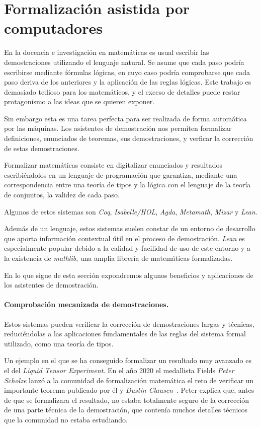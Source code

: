 \section{Formalización asistida por computadores}

En la docencia e investigación en matemáticas es usual escribir las
demostraciones utilizando el lenguaje natural. Se asume que cada paso podría
escribirse mediante fórmulas lógicas, en cuyo caso podría comprobarse que cada
paso deriva de los anteriores y la aplicación de las reglas lógicas. Este
trabajo es demasiado tedioso para los matemáticos, y el exceso
de detalles puede restar protagonismo a las ideas que se quieren exponer.

Sin embargo esta es una tarea perfecta para ser realizada de forma automática
por las máquinas. Los asistentes de demostración nos permiten formalizar
definiciones, enunciados de teoremas, sus demostraciones, y verficar la
corrección de estas demostraciones.

Formalizar matemáticas consiste en digitalizar enunciados y resultados
escribiéndolos en un lenguaje de programación que garantiza, mediante una
correspondencia entre una teoría de tipos y la lógica con el lenguaje de la
teoría de conjuntos, la validez de cada paso.

Algunos de estos sistemas son \textit{Coq},  \textit{Isabelle/HOL},  \textit{Agda},
\textit{Metamath}, \textit{Mizar} y \textit{Lean}.

Además de un lenguaje, estos sistemas suelen constar de un entorno de desarrollo
que aporta información contextual útil en el proceso de demostración.
\textit{Lean} es especialmente popular debido a la calidad y facilidad de uso de
este entorno y a la existencia de \textit{mathlib}, una amplia librería de
matemáticas formalizadas.

En lo que sigue de esta sección expondremos algunos beneficios y aplicaciones
de los asistentes de demostración.

\paragraph{Comprobación mecanizada de demostraciones.}

Estos sistemas pueden verificar la corrección de demostraciones largas y
técnicas, reduciéndolas a las aplicaciones fundamentales de las reglas del
sistema formal utilizado, como una teoría de tipos.

Un ejemplo en el que se ha conseguido formalizar un resultado muy avanzado es el
del \textit{Liquid Tensor Experiment}. En el año 2020 el medallista Fields
\textit{Peter Scholze} lanzó a la comunidad de formalización matemática el reto
de verificar un importante teorema publicado por él y \textit{Dustin
	Clausen}~\cite{scholzeLiquidTensorExperiment2022}. Peter explica que, antes de
que se formalizara el resultado, no estaba totalmente seguro de la corrección de
una parte técnica de la demostración, que contenía muchos detalles técnicos que
la comunidad no estaba estudiando.

